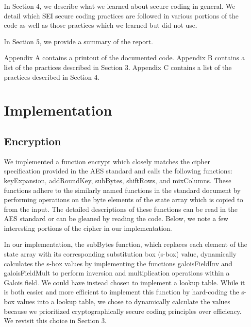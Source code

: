 \documentclass[a4paper,12pt]{article}
\begin{document}
In Section 4, we describe what we learned about secure coding in general. We detail which SEI secure coding practices are followed in various portions of the code as well as those practices which we learned but did not use.

In Section 5, we provide a summary of the report.

Appendix A contains a printout of the documented code. Appendix B contains a list of the practices described in Section 3. Appendix C contains a list of the practices described in Section 4.

\section{Implementation}

\subsection{Encryption}
We implemented a function {\selectfont encrypt} which closely matches the cipher specification provided in the AES standard \cite{AES} and calls the following functions: {\selectfont keyExpansion}, {\selectfont addRoundKey}, {\selectfont subBytes}, {\selectfont shiftRows}, and {\selectfont mixColumns}. These functions adhere to the similarly named functions in the standard document by performing operations on the byte elements of the state array which is copied to from the input. The detailed descriptions of these functions can be read in the AES standard or can be gleaned by reading the code. Below, we note a few interesting portions of the cipher in our implementation.

In our implementation, the {\selectfont subBytes} function, which replaces each element of the state array with its corresponding substitution box (s-box) value, dynamically calculates the s-box values by implementing the functions {\selectfont galoisFieldInv} and {\selectfont galoisFieldMult} to perform inversion and multiplication operations within a Galois field. We could have instead chosen to implement a lookup table. While it is both easier and more efficient to implement this function by hard-coding the s-box values into a lookup table, we chose to dynamically calculate the values because we prioritized cryptographically secure coding principles over efficiency. We revisit this choice in Section 3. 
\end{document}
